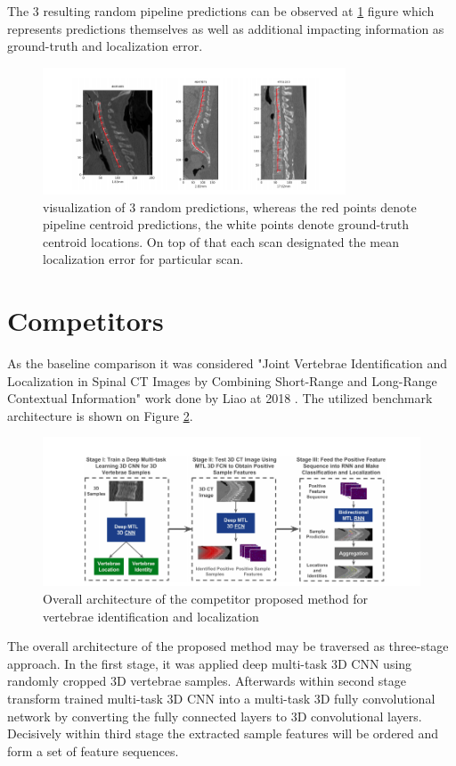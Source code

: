 The 3 resulting random pipeline predictions can be observed at \ref{fig:predictions} figure which represents predictions themselves as well as additional impacting information as ground-truth and localization error. 
\begin{figure}[h]
    \centering \includegraphics[width=9cm]{images/predictions.png}
    \caption {visualization of 3 random predictions, whereas the red points denote pipeline centroid predictions, the white points denote ground-truth centroid locations. On top of that each scan designated the mean localization error for particular scan.}
    \label{fig:predictions}
\end{figure}

\newpage
\section{Competitors}
As the baseline comparison it was considered "Joint Vertebrae Identification and Localization in Spinal CT Images by Combining Short-Range and Long-Range Contextual Information" work done by Liao at 2018 \cite{Liao2018}. The utilized benchmark architecture is shown on Figure \ref{fig:competitor}.

\begin{figure}[h]
    \centering \includegraphics[width=12cm]{images/competitor.png}
    \caption {Overall architecture of the competitor proposed method for vertebrae identification and localization}
    \label{fig:competitor}
\end{figure}

The overall architecture of the proposed method may be traversed as three-stage approach. In the first stage, it was applied deep multi-task 3D CNN using randomly cropped 3D vertebrae samples. Afterwards within second stage transform trained multi-task 3D CNN into a multi-task 3D fully convolutional network by converting the fully connected layers to 3D convolutional layers. Decisively within third stage the extracted sample features will be ordered and form a set of feature sequences. 

